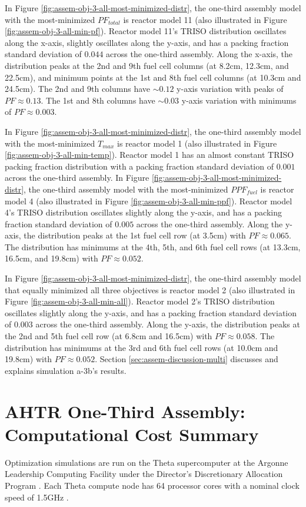 In Figure \ref{fig:assem-obj-3-all-most-minimized-distr}, the one-third assembly model 
with the most-minimized $PF_{total}$ is reactor model 11 (also illustrated in Figure 
\ref{fig:assem-obj-3-all-min-pf}). 
Reactor model 11's TRISO distribution oscillates along the x-axis, slightly 
oscillates along the y-axis, and has a packing fraction standard deviation of 
$0.044$ across the one-third assembly. 
Along the x-axis, the distribution peaks at the 2nd and 9th fuel cell columns 
(at 8.2cm, 12.3cm, and 22.5cm), and minimum points at the 1st and 8th fuel cell 
columns (at 10.3cm and 24.5cm).
The 2nd and 9th columns have ${\sim}0.12$ y-axis variation with peaks of 
$PF\approx0.13$. 
The 1st and 8th columns have ${\sim}0.03$ y-axis variation with minimums of 
$PF\approx0.003$. 

In Figure \ref{fig:assem-obj-3-all-most-minimized-distr}, the one-third assembly model 
with the most-minimized $T_{max}$ is reactor model 1 (also illustrated in Figure 
\ref{fig:assem-obj-3-all-min-temp}). 
Reactor model 1 has an almost constant TRISO packing fraction distribution with 
a packing fraction standard deviation of $0.001$ across the one-third assembly. 
In Figure \ref{fig:assem-obj-3-all-most-minimized-distr}, the one-third assembly model 
with the most-minimized $PPF_{fuel}$ is reactor model 4 (also illustrated in Figure 
\ref{fig:assem-obj-3-all-min-ppf}). 
Reactor model 4's TRISO distribution oscillates slightly along the y-axis, and has a 
packing fraction standard deviation of $0.005$ across the one-third assembly. 
Along the y-axis, the distribution peaks at the 1st fuel cell row (at 3.5cm) with 
$PF\approx0.065$. 
The distribution has minimums at the 4th, 5th, and 6th fuel cell rows (at 13.3cm, 
16.5cm, and 19.8cm) with $PF\approx0.052$.

In Figure \ref{fig:assem-obj-3-all-most-minimized-distr}, the one-third assembly model 
that equally minimized all three objectives is reactor model 2 (also illustrated in 
Figure \ref{fig:assem-obj-3-all-min-all}).  
Reactor model 2's TRISO distribution oscillates slightly along the y-axis, and has a 
packing fraction standard deviation of $0.003$ across the one-third assembly.
Along the y-axis, the distribution peaks at the 2nd and 5th fuel cell row 
(at 6.8cm and 16.5cm) with $PF\approx0.058$. 
The distribution has minimums at the 3rd and 6th fuel cell rows (at 10.0cm and 19.8cm) 
with $PF\approx0.052$.
Section \ref{sec:assem-discussion-multi} discusses and explains simulation a-3b's 
results.

\section{AHTR One-Third Assembly: Computational Cost Summary}
\label{sec:assem-compute-cost}
Optimization simulations are run on the Theta supercomputer at the Argonne Leadership 
Computing Facility under the Director's Discretionary Allocation Program 
\cite{noauthor_argonne_2022}. 
Each Theta compute node has 64 processor cores with a nominal clock speed of 
1.5GHz \cite{noauthor_argonne_2022}.  

